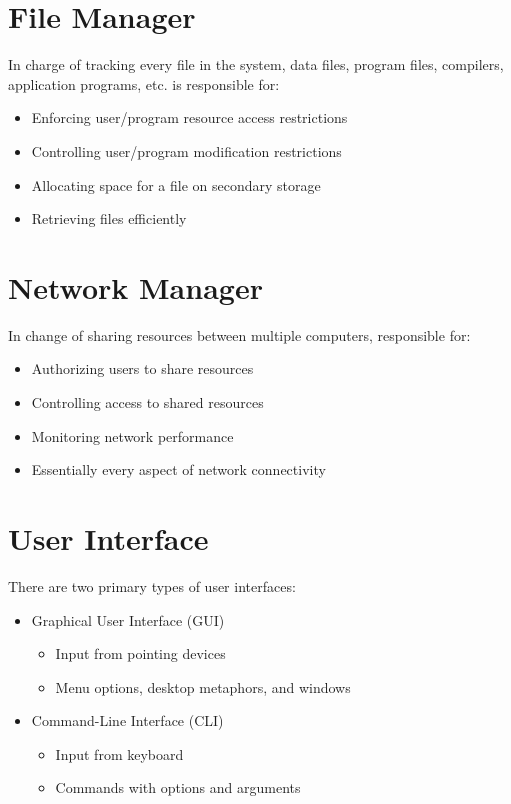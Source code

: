 \documentclass[12pt letter]{report}
\begin{document}
\section{File Manager}

In charge of tracking every file in the system, data files, program files, compilers, application programs, etc. is responsible for:
\begin{itemize}
  \item Enforcing user/program resource access restrictions
  \item Controlling user/program modification restrictions
  \item Allocating space for a file on secondary storage
  \item Retrieving files efficiently
\end{itemize}

\section{Network Manager}

In change of sharing resources between multiple computers, responsible for:
\begin{itemize}
  \item Authorizing users to share resources
  \item Controlling access to shared resources
  \item Monitoring network performance
  \item Essentially every aspect of network connectivity
\end{itemize}

\section{User Interface}


There are two primary types of user interfaces:

\begin{itemize}
  \item Graphical User Interface (GUI)
        \begin{itemize}
          \item Input from pointing devices
          \item Menu options, desktop metaphors, and windows
        \end{itemize}
  \item Command-Line Interface (CLI)
        \begin{itemize}
          \item Input from keyboard
          \item Commands with options and arguments
        \end{itemize}
\end{itemize}
\end{document}
